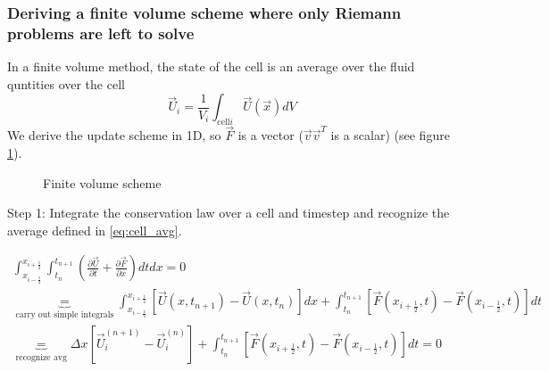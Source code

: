 \subsubsection{Deriving a finite volume scheme where only Riemann problems are left to solve}
In a finite volume method, the state of the cell is an average over the fluid quntities over the cell
\begin{equation}
    \label{eq:cell_avg}
    \vec{U}_i = \frac{1}{V_i} \int_{\text{cell} i}{\vec{U}(\vec{x})} dV
\end{equation}
We derive the update scheme in 1D, so $\vec{F}$ is a vector ($\vec{v}\vec{v}^T$ is a scalar) (see figure \ref{fig:finite_volume_scheme}).

\begin{figure}[htb!]
    \centering
    
    \caption{Finite volume scheme}
    \label{fig:finite_volume_scheme}
\end{figure}

\textcolor{blue1}{Step 1}: Integrate the conservation law over a cell and timestep and recognize the average
defined in \ref{eq:cell_avg}.

\begin{equation}
    \begin{gathered}
        \int_{x_{i-\frac{1}{2}}}^{x_{i+\frac{1}{2}}} \int_{t_n}^{t_{n+1}}\left(\frac{\partial \vec{U}}{\partial t}+\frac{\partial \vec{F}}{\partial x}\right) d t d x=0 \\
        \underbrace{=}_{\text{carry out simple integrals}} \int_{x_{i-\frac{1}{2}}}^{x_{i+\frac{1}{2}}}\left[\vec{U}\left(x, t_{n+1}\right)-\vec{U}\left(x, t_n\right)\right] d x+\int_{t_n}^{t_{n+1}}\left[\vec{F}\left(x_{i+\frac{1}{2}}, t\right)-\vec{F}\left(x_{i-\frac{1}{2}}, t\right)\right] dt \\
        \underbrace{=}_{\text{recognize avg}} \Delta x\left[\vec{U}_i^{(n+1)}-\vec{U}_i^{(n)}\right]+\int_{t_n}^{t_{n+1}}\left[\vec{F}\left(x_{i+\frac{1}{2}}, t\right)-\vec{F}\left(x_{i-\frac{1}{2}}, t\right)\right] d t=0
    \end{gathered}
    \label{eq:finite_volume_scheme_step1}
\end{equation}

